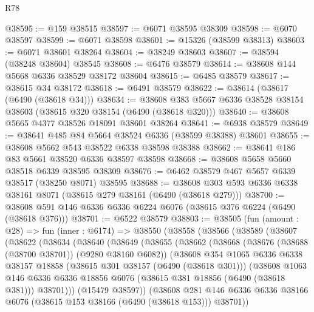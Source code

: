 \begin{lexlean}{R78}
\begin{coremodule}
@38595 := @159 @38515
@38597 := @6071 @38595 @38309
@38598 := @6070 @38597
@38599 := @6071 @38598
@38601 := @15326 (@38599 @38313)
@38603 := @6071 @38601 @38264
@38604 := @38249 @38603
@38607 := @38594 (@38248 @38604) @38545
@38608 := @6476 @38579
@38614 := @38608 @144 @5668 @6336 @38529 @38172 @38604
@38615 := @6485 @38579
@38617 := @38615 @34 @38172
@38618 := @6491 @38579
@38622 := @38614 (@38617 (@6490 (@38618 @34)))
@38634 := @38608 @383 @5667 @6336 @38528 @38154 @38603 (@38615 @320 @38154 (@6490 (@38618 @320)))
@38640 := @38608 @5665 @4377 @38526 @18091 @38601 @38264
@38641 := @6938 @38579
@38649 := @38641 @485 @84 @5664 @38524 @6336 (@38599 @38388) @38601
@38655 := @38608 @5662 @543 @38522 @6338 @38598 @38388
@38662 := @38641 @186 @83 @5661 @38520 @6336 @38597 @38598
@38668 := @38608 @5658 @5660 @38518 @6339 @38595 @38309
@38676 := @6462 @38579 @467 @5657 @6339 @38517 (@38250 @8071) @38595
@38688 := @38608 @303 @593 @6336 @6338 @38161 @8071 (@38615 @279 @38161 (@6490 (@38618 @279)))
@38700 := @38608 @591 @146 @6336 @6336 @6224 @6076 (@38615 @376 @6224 (@6490 (@38618 @376)))
@38701 := @6522 @38579
@38803 := @38505
    (fun (amount : @28) =>
    fun (inner : @6174) =>
    @38550
      (@38558
        (@38566
          (@38589
            (@38607
              (@38622
                (@38634
                  (@38640
                    (@38649
                      (@38655
                        (@38662
                          (@38668
                            (@38676 (@38688 (@38700 @38701)) (@9280 @38160 @6082))
                            (@38608
                              @354
                              @1065
                              @6336
                              @6338
                              @38157
                              @18858
                              (@38615 @301 @38157 (@6490 (@38618 @301)))
                              (@38608
                                @1063
                                @146
                                @6336
                                @6336
                                @18856
                                @6076
                                (@38615 @381 @18856 (@6490 (@38618 @381)))
                                @38701)))
                          (@15479 @38597))
                        (@38608
                          @281
                          @146
                          @6336
                          @6336
                          @38166
                          @6076
                          (@38615 @153 @38166 (@6490 (@38618 @153)))
                          @38701))

\end{coremodule}
\end{lexlean}

